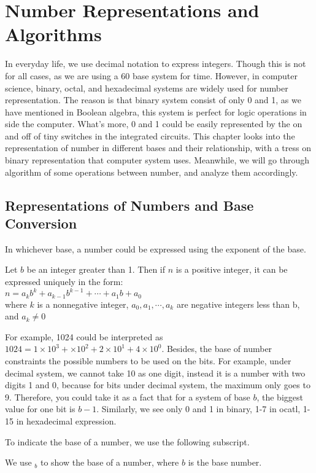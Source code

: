 \section{Number Representations and Algorithms}
    In everyday life, we use decimal notation to express integers. Though this is not
    for all cases, as we are using a 60 base system for time. However, in computer science, binary, octal, and hexadecimal
    systems are widely used for number representation. The reason is that binary system consist of 
    only 0 and 1, as we have mentioned in Boolean algebra, this system is perfect for logic operations
    in side the computer. What's more, 0 and 1 could be easily represented by the on and off of tiny
    switches in the integrated circuits. This chapter looks into the representation of number
    in different bases and their relationship, with a tress on binary representation that computer
    system uses. Meanwhile, we will go through algorithm of some operations between number, and
    analyze them accordingly.
    \subsection{Representations of Numbers and Base Conversion}
    In whichever base, a number could be expressed using the exponent of the base.
    \begin{theorem}
		Let $b$ be an integer greater than 1. Then if $n$ is a positive integer, it can be expressed uniquely 
		in the form:\\
		$n=a_{k} b^{k}+a_{k-1} b^{k-1}+\cdots+a_{1} b+a_{0}$\\
		where $k$ is a nonnegative integer, $a_0, a_1,\cdots, a_k$ are negative integers less than b, and $a_k \neq 0$
	\end{theorem}
    For example, 1024 could be interpreted as $1024 = 1\times10^3+\times10^2+2\times10^1+4\times10^0$.
    Besides, the base of number constraints the possible numbers to be used on the bits. For example,
    under decimal system, we cannot take 10 as one digit, instead it is a number with two digits 1 and 0,
    because for bits under decimal system, the maximum only goes to 9. Therefore, you could take it as
    a fact that for a system of base $b$, the biggest value for one bit is $b-1$. Similarly, we see
    only 0 and 1 in binary, 1-7 in ocatl, 1-15 in hexadecimal expression.

    To indicate the base of a number, we use the following subscript.
    \begin{notation}[$xxxx_b$]
        We use $_b$ to show the base of a number, where $b$ is the base number.
    \end{notation}

